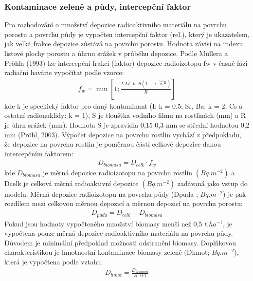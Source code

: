 \documentclass[letterpaper,10pt,english]{sphinxmanual}
\begin{document}
\subsubsection{Kontaminace zeleně a půdy, intercepční faktor}
\label{\detokenize{description:kontaminace-zelene-a-pudy-intercepcni-faktor}}
Pro rozhodování o množství depozice radioaktivního materiálu na povrchu
porostu a povrchu půdy je vypočten intercepční faktor (rel.), který je
ukazatelem, jak velká frakce depozice zůstává na povrchu porostu. Hodnota
závisí na indexu listové plochy porostu a úhrnu srážek v průběhu depozice.
Podle Müllera a Pröhla (1993) lze intercepční frakci (faktor) depozice
radioizotopu fw v časné fázi radiační havárie vypočítat podle vzorce:
\begin{equation*}
\begin{split}f_{w}=\min\left[1;\frac{LAI\cdot k\cdot S\left(1-\mathrm{e^{-\frac{\ln2}{3S}R}}\right)}{R}\right]\end{split}
\end{equation*}
kde k je specifický faktor pro daný kontaminant (I: k = 0.5; Sr, Ba: k = 2;
Cs a ostatní radionuklidy: k = 1), S je tloušťka vodního filmu na rostlinách
(mm) a R je úhrn srážek (mm). Hodnota S je zpravidla 0,15 \textendash{} 0,3 mm se střední
hodnotou 0,2 mm (Pröhl, 2003). Výpočet depozice na povrchu rostlin vychází z
předpokladu, že depozice na povrchu rostlin je poměrnou částí celkové
depozice danou intercepčním faktorem:
\begin{equation*}
\begin{split}D_{biomasa}=D_{celk}\cdot f_{w}\end{split}
\end{equation*}
kde \(D_{biomasa}\) je měrná depozice radioizotopu na povrchu rostlin
\((Bq.m^{-2})\) a Dcelk je celková měrná radioaktivní depozice \((Bq
.m^{-2})\) zadávaná jako vstup do modelu. Měrná depozice radioizotopu na
povrchu půdy (Dpuda ; \(Bq.m^{-2}\)) je pak rozdílem mezi celkovou měrnou
depozicí a měrnou depozicí na povrchu porostu:
\begin{equation*}
\begin{split}D_{puda}=D_{celk}-D_{biomasa}\end{split}
\end{equation*}
Pokud jsou hodnoty vypočteného množství biomasy menší než 0,5 \(t
.ha^{-1}\), je vypočtena pouze měrná depozice radioaktivního materiálu na
povrchu půdy. Důvodem je minimální předpoklad možnosti odstranění biomasy.
Doplňkovou charakteristikou je hmotnostní kontaminace biomasy zeleně (Dhmot;
\(Bq.m^{-2}\)), která je vypočtena podle vztahu:
\begin{equation*}
\begin{split}D_{hmot}=\frac{D_{biomasa}}{B \cdot 0.1}\end{split}
\end{equation*}
\end{document}
